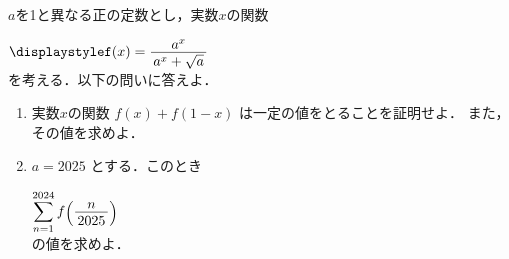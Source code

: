 \documentclass[../../../uem_mat_mei_q.tex]{subfiles}
\begin{document}
    $a$を1と異なる正の定数とし，実数$x$の関数

    \myspaceb%
    $\displaystyle%
        f(x)=\myfraca{a^x}{a^x+\sqrt{a}}%
    $\\
    を考える．以下の問いに答えよ．

    \begin{enumerate}
        \item 実数$x$の関数 $f(x)+f(1-x)$ は一定の値をとることを証明せよ．%
            また，その値を求めよ．
        \item $a=2025$ とする．このとき
        
            \myspaceb%
            $\displaystyle%
                \sum_{n=1}^{2024}f\raisebox{-1pt}{$\Bigl($}%
                \myfraca{n}{2025}\raisebox{-1pt}{$\Bigr)$}%
            $\\
            の値を求めよ．
    \end{enumerate}
\end{document}
